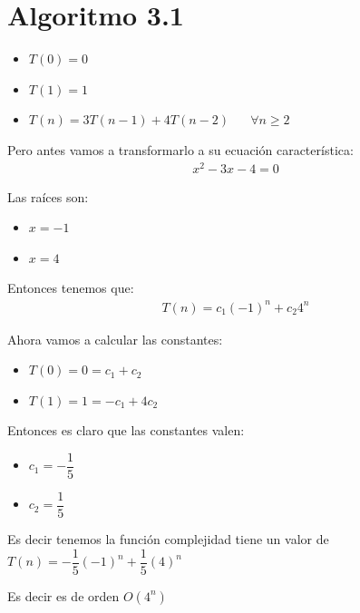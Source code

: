 \documentclass[12pt, fleqn]{article}                            %
\DeclareMathOperator \Space {\quad}                             %
\theoremstyle{break}                                            %
\begin{document}
    \section{Algoritmo 3.1}

        \begin{itemize}
            \item $T(0) = 0$
            \item $T(1) = 1$
            \item $T(n) = 3T(n - 1) + 4T(n - 2) \Space \forall n \geq 2$
        \end{itemize}

        Pero antes vamos a transformarlo a su ecuación característica:
        \begin{align*}
            x^2 -3x - 4 = 0
        \end{align*}

        Las raíces son:
        \begin{itemize}
            \item $x = -1$
            \item $x = 4$
        \end{itemize}

        Entonces tenemos que:
        \begin{align*}
            T(n) = c_1(-1)^n + c_2 4^n
        \end{align*}

        Ahora vamos a calcular las constantes:
        \begin{itemize}
            \item $T(0) = 0 = c_1 + c_2$
            \item $T(1) = 1 = -c_1 + 4c_2$
        \end{itemize}

        Entonces es claro que las constantes valen:
        \begin{itemize}
            \item $c_1 = -\dfrac{1}{5}$
            \item $c_2 = \dfrac{1}{5}$
        \end{itemize}

        Es decir tenemos la función complejidad tiene un valor de
        $T(n) = -\dfrac{1}{5}(-1)^n + \dfrac{1}{5}(4)^n$

        Es decir es de orden $O(4^n)$




    \clearpage
\end{document}
